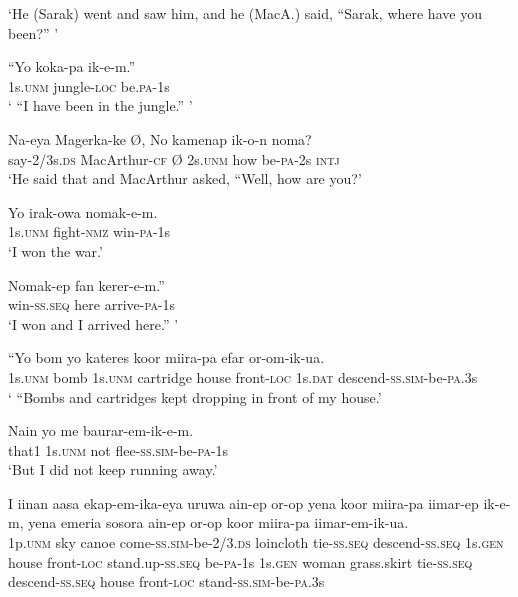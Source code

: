 {\glt ‘He (Sarak) went and saw him, and he (MacA.) said, “Sarak, where have you been?” ’ \\
\z


\ea\label{ex:a:x109}
\gll  “Yo  koka-pa  ik-e-m.” \\
1s.\textsc{unm}  jungle-\textsc{loc}  be.\textsc{pa}-1s \\
\glt ‘ “I have been in the jungle.” ’ \\
\z


\ea\label{ex:a:x110}
\gll  Na-eya  Magerka-ke  Ø,  {\textquotedbl}No  kamenap  ik-o-n  noma? \\
say-2/3s.\textsc{ds}  MacArthur-\textsc{cf}  Ø  2s.\textsc{unm}  how  be-\textsc{pa}-2s  \textsc{intj} \\
\glt ‘He said that and MacArthur asked, “Well, how are you?’ \\
\z


\ea\label{ex:a:x111}
\gll  Yo  irak-owa  nomak-e-m. \\
1s.\textsc{unm}  fight-\textsc{nmz}  win-\textsc{pa}-1s \\
\glt ‘I won the war.’ \\
\z


\ea\label{ex:a:x112}
\gll  Nomak-ep  fan  kerer-e-m.” \\
win-\textsc{ss.seq}  here  arrive-\textsc{pa}-1s \\
\glt ‘I won and I arrived here.” ’ \\
\z


\ea\label{ex:a:x113}
\gll  “Yo  bom  yo  kateres  koor  miira-pa  efar           or-om-ik-ua. \\
1s.\textsc{unm}  bomb  1s.\textsc{unm}  cartridge  house  front-\textsc{loc}  1s.\textsc{dat}   descend-\textsc{ss}.\textsc{sim}-be-\textsc{pa}.3s \\


\glt ‘ “Bombs and cartridges kept dropping in front of my house.’ \\
\z


\ea\label{ex:a:x114}
\gll  Nain  yo  me  baurar-em-ik-e-m. \\
that1  1s.\textsc{unm}  not  flee-\textsc{ss}.\textsc{sim}-be-\textsc{pa}-1s \\
\glt ‘But I did not keep running away.’ \\
\z


\ea\label{ex:a:x115}
\gll  I  iinan  aasa  ekap-em-ika-eya  uruwa  ain-ep             or-op  yena  koor  miira-pa  iimar-ep                     ik-e-m,  yena  emeria  sosora  ain-ep  or-op                        koor  miira-pa  iimar-em-ik-ua. \\
1p.\textsc{unm}  sky  canoe  come-\textsc{ss}.\textsc{sim}-be-2/3.\textsc{ds}  loincloth  tie-\textsc{ss.seq} descend-\textsc{ss.seq}  1s.\textsc{gen}  house  front-\textsc{loc}  stand.up-\textsc{ss.seq} be-\textsc{pa}-1s  1s.\textsc{gen}  woman  grass.skirt  tie-\textsc{ss.seq}  descend-\textsc{ss.seq}    house  front-\textsc{loc}  stand-\textsc{ss}.\textsc{sim}-be-\textsc{pa}.3s \\






}
